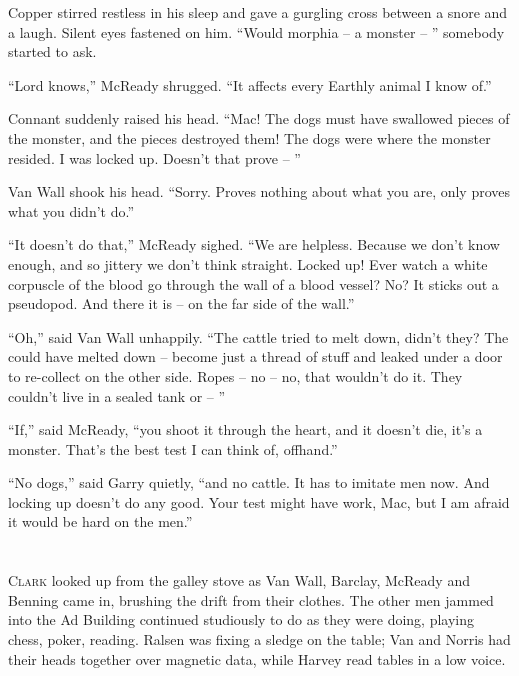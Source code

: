 \documentclass[letterpaper,openany,12pt]{memoir}		%
\begin{document}
Copper stirred restless in his sleep and gave a gurgling cross between a snore
and a laugh. Silent eyes fastened on him. ``Would morphia -- a monster -- ''
somebody started to ask.

``Lord knows,'' McReady shrugged. ``It affects every Earthly animal I know of.''

Connant suddenly raised his head. ``Mac! The dogs must have swallowed pieces of
the monster, and the pieces destroyed them! The dogs were where the monster
resided. I was locked up. Doesn't that prove -- ''

Van Wall shook his head. ``Sorry. Proves nothing about what you are, only proves
what you didn't do.''

``It doesn't do that,'' McReady sighed. ``We are helpless. Because we don't know
enough, and so jittery we don't think straight. Locked up! Ever watch a white
corpuscle of the blood go through the wall of a blood vessel? No? It sticks out
a pseudopod. And there it is -- on the far side of the wall.''

``Oh,'' said Van Wall unhappily. ``The cattle tried to melt down, didn't they?
The could have melted down -- become just a thread of stuff and leaked under a
door to re-collect on the other side. Ropes -- no -- no, that wouldn't do it.
They couldn't live in a sealed tank or -- ''

``If,'' said McReady, ``you shoot it through the heart, and it doesn't die, it's
a monster. That's the best test I can think of, offhand.''

``No dogs,'' said Garry quietly, ``and no cattle. It has to imitate men now. And
locking up doesn't do any good. Your test might have work, Mac, but I am afraid
it would be hard on the men.''


\chapter[Chapter 10]{}

\lettrine[lines=3,findent=3pt,nindent=2pt]{C}{lark} looked up from the galley
stove as Van Wall, Barclay, McReady and Benning came in, brushing the drift from
their clothes. The other men jammed into the Ad Building continued studiously to
do as they were doing, playing chess, poker, reading. Ralsen was fixing a sledge
on the table; Van and Norris had their heads together over magnetic data, while
Harvey read tables in a low voice.
\end{document}
